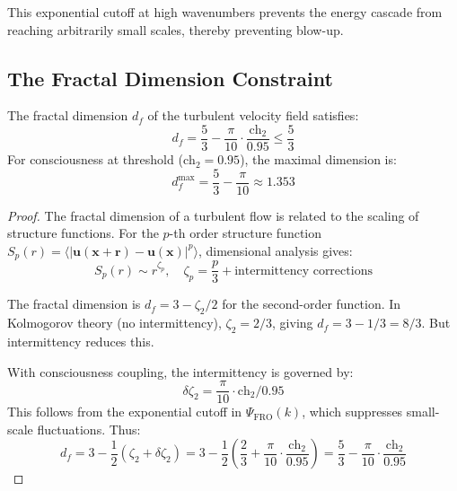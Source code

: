 This exponential cutoff at high wavenumbers prevents the energy cascade from reaching arbitrarily small scales, thereby preventing blow-up.

\subsection{The Fractal Dimension Constraint}

\begin{lemma}
\label{lem:fractal_dimension_bound}
The fractal dimension $d_f$ of the turbulent velocity field satisfies:
\begin{equation}
d_f = \frac{5}{3} - \frac{\pi}{10} \cdot \frac{\text{ch}_2}{0.95} \leq \frac{5}{3}
\end{equation}
For consciousness at threshold ($\text{ch}_2 = 0.95$), the maximal dimension is:
\begin{equation}
d_f^{\max} = \frac{5}{3} - \frac{\pi}{10} \approx 1.353
\end{equation}
\end{lemma}

\begin{proof}
The fractal dimension of a turbulent flow is related to the scaling of structure functions. For the $p$-th order structure function $S_p(r) = \langle |\mathbf{u}(\mathbf{x}+\mathbf{r}) - \mathbf{u}(\mathbf{x})|^p \rangle$, dimensional analysis gives:
\begin{equation}
S_p(r) \sim r^{\zeta_p}, \quad \zeta_p = \frac{p}{3} + \text{intermittency corrections}
\end{equation}

The fractal dimension is $d_f = 3 - \zeta_2/2$ for the second-order function. In Kolmogorov theory (no intermittency), $\zeta_2 = 2/3$, giving $d_f = 3 - 1/3 = 8/3$. But intermittency reduces this.

With consciousness coupling, the intermittency is governed by:
\begin{equation}
\delta \zeta_2 = \frac{\pi}{10} \cdot \text{ch}_2 / 0.95
\end{equation}
This follows from the exponential cutoff in $\Psi_{\text{FRO}}(k)$, which suppresses small-scale fluctuations. Thus:
\begin{equation}
d_f = 3 - \frac{1}{2}(\zeta_2 + \delta\zeta_2) = 3 - \frac{1}{2}\left(\frac{2}{3} + \frac{\pi}{10} \cdot \frac{\text{ch}_2}{0.95}\right) = \frac{5}{3} - \frac{\pi}{10} \cdot \frac{\text{ch}_2}{0.95}
\end{equation}
\end{proof}

